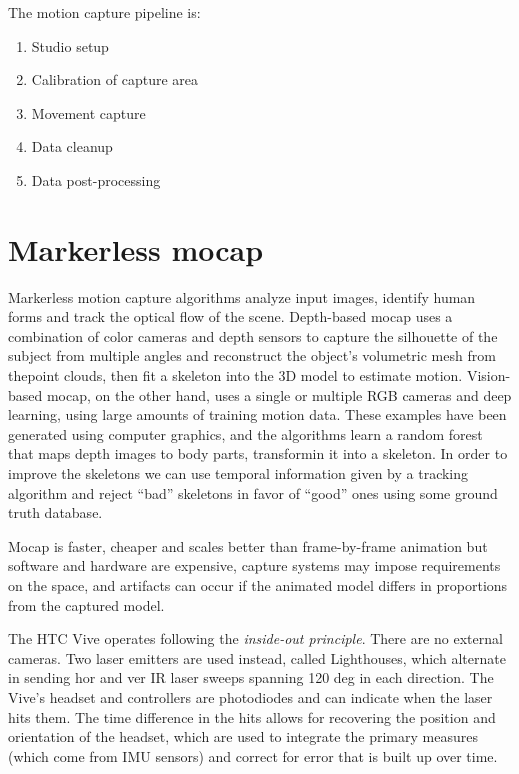 \documentclass[a4paper]{article}
\begin{document}
The motion capture pipeline is:

\begin{enumerate}


\item
  Studio setup
\item
  Calibration of capture area
\item
  Movement capture
\item
  Data cleanup
\item
  Data post-processing
\end{enumerate}


\section{Markerless mocap}

Markerless motion capture algorithms analyze input images, identify
human forms and track the optical flow of the scene. Depth-based mocap
uses a combination of color cameras and depth sensors to capture the
silhouette of the subject from multiple angles and reconstruct the
object's volumetric mesh from thepoint clouds, then fit a skeleton into
the 3D model to estimate motion. Vision-based mocap, on the other hand,
uses a single or multiple RGB cameras and deep learning, using large
amounts of training motion data. These examples have been generated
using computer graphics, and the algorithms learn a random forest that
maps depth images to body parts, transformin it into a skeleton. In
order to improve the skeletons we can use temporal information given by
a tracking algorithm and reject ``bad'' skeletons in favor of ``good''
ones using some ground truth database.

Mocap is faster, cheaper and scales better than frame-by-frame animation
but software and hardware are expensive, capture systems may impose
requirements on the space, and artifacts can occur if the animated model
differs in proportions from the captured model.

The HTC Vive operates following the \emph{inside-out principle}. There
are no external cameras. Two laser emitters are used instead, called
Lighthouses, which alternate in sending hor and ver IR laser sweeps
spanning 120 deg in each direction. The Vive's headset and controllers
are photodiodes and can indicate when the laser hits them. The time
difference in the hits allows for recovering the position and
orientation of the headset, which are used to integrate the primary
measures (which come from IMU sensors) and correct for error that is
built up over time.
\end{document}
